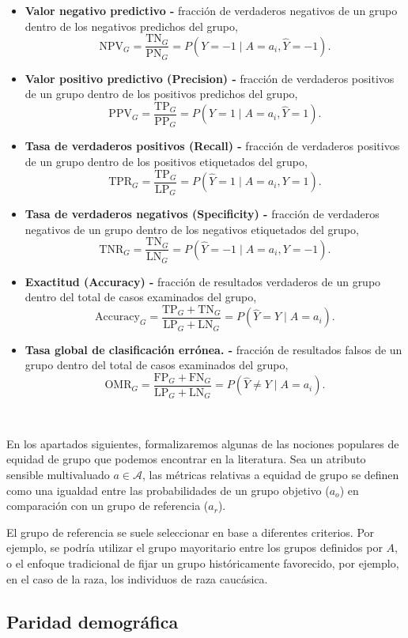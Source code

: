 \documentclass[oneside,openright,titlepage,numbers=noenddot,openany,headinclude,footinclude=true,
cleardoublepage=empty,abstractoff,BCOR=5mm,paper=a4,fontsize=12pt,main=spanish]{scrreprt}
\begin{document}
\begin{itemize}
    \item \textbf{Valor negativo predictivo -} fracción de verdaderos negativos de un grupo dentro de los negativos predichos del grupo, $$\text{NPV}_G = \frac{\text{TN}_G}{\text{PN}_G} = P(Y=-1 \mid A=a_i,\hat{Y}=-1).$$
    \item \textbf{Valor positivo predictivo (Precision) -} fracción de verdaderos positivos de un grupo dentro de los positivos predichos del grupo, $$\text{PPV}_G = \frac{\text{TP}_G}{\text{PP}_G} = P(Y=1 \mid A=a_i,\hat{Y}=1).$$
    \item \textbf{Tasa de verdaderos positivos (Recall) -} fracción de verdaderos positivos de un grupo dentro de los positivos etiquetados del grupo, $$\text{TPR}_G = \frac{\text{TP}_G}{\text{LP}_G} = P(\hat{Y}=1 \mid A=a_i,Y=1).$$
    \item \textbf{Tasa de verdaderos negativos (Specificity) -} fracción de verdaderos negativos de un grupo dentro de los negativos etiquetados del grupo, $$\text{TNR}_G = \frac{\text{TN}_G}{\text{LN}_G} = P(\hat{Y}=-1 \mid A=a_i,Y=-1).$$
    \item \textbf{Exactitud (Accuracy) -} fracción de resultados verdaderos de un grupo dentro del total de casos examinados del grupo, $$\text{Accuracy}_G = \frac{\text{TP}_G+\text{TN}_G}{\text{LP}_G+\text{LN}_G} = P(\hat{Y}=Y \mid A=a_i).$$
    \item \textbf{Tasa global de clasificación errónea. -} fracción de resultados falsos de un grupo dentro del total de casos examinados del grupo, $$\text{OMR}_G = \frac{\text{FP}_G+\text{FN}_G}{\text{LP}_G+\text{LN}_G} = P(\hat{Y}\neq Y \mid A=a_i).$$
\end{itemize}\

En los apartados siguientes, formalizaremos algunas de las nociones populares de equidad de grupo que podemos encontrar en la literatura. Sea un atributo sensible multivaluado $a\in \mathcal{A}$, las métricas relativas a equidad de grupo se definen como una igualdad entre las probabilidades de un grupo objetivo ($a_o$) en comparación con un grupo de referencia ($a_r$).

El grupo de referencia se suele seleccionar en base a diferentes criterios. Por ejemplo, se podría utilizar el grupo mayoritario entre los grupos definidos por $A$, o el enfoque
tradicional de fijar un grupo históricamente favorecido, por ejemplo, en el caso de la raza, los individuos de raza caucásica.


\subsection{Paridad demográfica}
\end{document}
